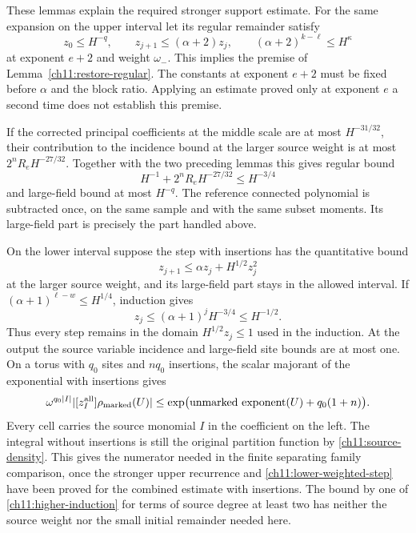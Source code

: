 These lemmas explain the required stronger support estimate.
For the same expansion on the upper interval let its regular remainder satisfy
\[
 z_0\le H^{-q},\qquad z_{j+1}\le(\alpha+2)z_j,\qquad
 (\alpha+2)^{k-\ell}\le H^\kappa
\]
at exponent $e+2$ and weight $\omega_-$.
This implies the premise of Lemma~\ref{ch11:restore-regular}.
The constants at exponent $e+2$ must be fixed before $\alpha$
and the block ratio. Applying an estimate proved only at exponent
$e$ a second time does not establish this premise.

If the corrected principal coefficients at the middle scale are at
most $H^{-31/32}$, their contribution to the incidence bound at the larger source
weight is at most $2^nR_eH^{-27/32}$.
Together with the two preceding lemmas this gives regular
bound
\[
 H^{-1}+2^nR_eH^{-27/32}\le H^{-3/4}
\]
and large-field bound at most $H^{-q}$.
The reference connected polynomial is subtracted once, on the
same sample and with the same subset moments.
Its large-field part is precisely the part handled above.

On the lower interval suppose the step with insertions has the
quantitative bound
\begin{equation}\label{ch11:lower-weighted-step}
 z_{j+1}\le\alpha z_j+H^{1/2}z_j^2
\end{equation}
at the larger source weight, and its large-field part stays in the
allowed interval. If
$(\alpha+1)^{\ell-w}\le H^{1/4}$, induction gives
\[
 z_j\le(\alpha+1)^jH^{-3/4}\le H^{-1/2}.
\]
Thus every step remains in the domain
$H^{1/2}z_j\le1$ used in the induction.
At the output the source variable incidence and large-field site bounds
are at most one. On a torus with $q_0$ sites and $nq_0$ insertions,
the scalar majorant of the exponential with insertions gives
\begin{equation}\label{ch11:weighted-output-envelope}
 \omega^{q_0|I|}|[z_I^{\rm all}]\rho_{\rm marked}(U)|
 \le\exp\bigl(\text{unmarked exponent}(U)+q_0(1+n)\bigr).
\end{equation}
Every cell carries the source monomial $I$ in the coefficient on the left.
The integral without insertions is still the original partition function
by \eqref{ch11:source-density}.
This gives the numerator needed in the finite separating family
comparison, once the stronger upper recurrence and
\eqref{ch11:lower-weighted-step} have been proved for the combined estimate with insertions. The bound by one of \eqref{ch11:higher-induction} for terms of source degree at least two has neither
the source weight nor the small initial remainder needed here.

